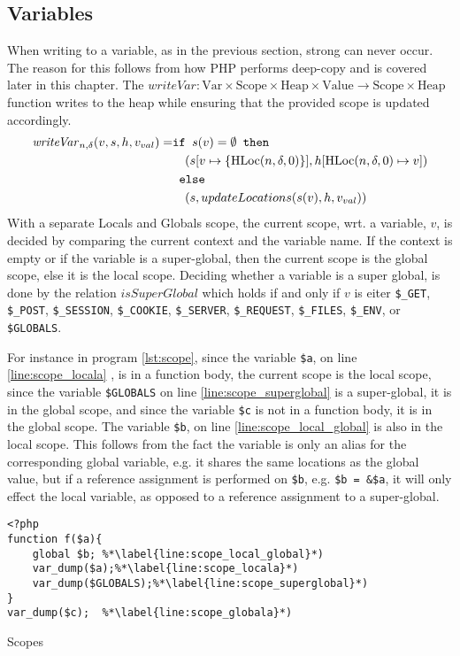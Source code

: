 \subsection{Variables}
When writing to a variable, as in the previous section, strong can never occur. The reason for this follows from how PHP performs deep-copy and is covered later in this chapter. The $\mathit{writeVar}: \text{Var} \times \text{Scope} \times \text{Heap} \times \text{Value} \rightarrow \text{Scope} \times \text{Heap}$ function writes to the heap while ensuring that the provided scope is updated accordingly. 
\begin{align}
\mathit{writeVar}_{n,\delta}(v,s,h,v_{val}) =  &\texttt{if }s(v) = \emptyset\texttt{ then } \notag\\
                            &\quad (s[v\mapsto\{\text{HLoc}(n,\delta, 0)\}],h[\text{HLoc}(n,\delta, 0)\mapsto v]) \notag\\
                            & \texttt{ else } \notag\\
                            &\quad (s, updateLocations(s(v), h, v_{val}))
\end{align}
With a separate { Locals} and { Globals} scope, the current scope, wrt. a variable, $v$, is decided by comparing the current context and the variable name. If the context is empty or if the variable is a super-global, then the current scope is the global scope, else it is the local scope. Deciding whether a variable is a super global, is done by the relation $\mathit{isSuperGlobal}$ which holds if and only if $v$ is eiter \texttt{\$\_GET}, \texttt{\$\_POST}, \texttt{\$\_SESSION}, \texttt{\$\_COOKIE}, \texttt{\$\_SERVER}, \texttt{\$\_REQUEST}, \texttt{\$\_FILES}, \texttt{\$\_ENV}, or \texttt{\$GLOBALS}.

For instance in program \ref{lst:scope}, since the variable \texttt{\$a}, on line \ref{line:scope_locala} , is in a function body, the current scope is the local scope, since the variable \texttt{\$GLOBALS} on line \ref{line:scope_superglobal} is a super-global, it is in the global scope, and since the variable \texttt{\$c} is not in a function body, it is in the global scope. The variable \texttt{\$b}, on line \ref{line:scope_local_global} is also in the local scope. This follows from the fact the variable is only an alias for the corresponding global variable, e.g. it shares the same locations as the global value, but if a reference assignment is performed on \texttt{\$b}, e.g. \texttt{\$b = \&\$a}, it will only effect the local variable, as opposed to a reference assignment to a super-global.
\begin{program}
\begin{lstlisting}
<?php
function f($a){
	global $b; %*\label{line:scope_local_global}*)
	var_dump($a);%*\label{line:scope_locala}*)
	var_dump($GLOBALS);%*\label{line:scope_superglobal}*)
}
var_dump($c);  %*\label{line:scope_globala}*)
\end{lstlisting}
\caption{Scopes}
\label{lst:scope}
\end{program}

